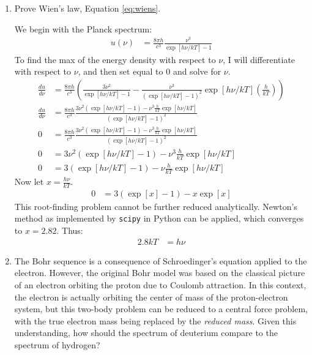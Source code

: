\begin{enumerate}
\item Prove Wien's law, Equation \ref{eq:wiens}.

\begin{answer}
We begin with the Planck spectrum:
    \begin{align*}
        u(\nu) & = \frac{8 \pi h}{c^3} \frac{\nu^3}{\exp[h \nu / k T] - 1}
    \end{align*}
    To find the max of the energy density with respect to $\nu$, I will differentiate with respect to $\nu$, and then set equal to 0 and solve for $\nu$.
    \begin{align*}
        \frac{d u}{d \nu} & = \frac{8 \pi h}{c^3}
    \left( \frac{3 \nu^2}{\exp[h \nu / k T] - 1} - \frac{\nu^3}{(\exp[h \nu
    / k T] - 1)^2}\exp[h \nu/k T]\left(\frac{h}{k T}\right) \right) \\
        \frac{d u}{d \nu} & = \frac{8 \pi h}{c^3} \frac{3 \nu^2 (\exp[h \nu / k T] - 1) - \nu^3 \frac{h}{k T} \exp[h \nu/k T]}{(\exp[h \nu / k T] - 1)^2} \\
        0 & = \frac{8 \pi h}{c^3} \frac{3 \nu^2 (\exp[h \nu / k T] - 1) - \nu^3 \frac{h}{k T} \exp[h \nu/k T]}{(\exp[h \nu / k T] - 1)^2} \\
        0 & =  3 \nu^2 (\exp[h \nu / k T] - 1) - \nu^3 \frac{h}{k T} \exp[h \nu/k T] \\
        0 & =  3 (\exp[h \nu / k T] - 1) - \nu \frac{h}{k T} \exp[h \nu/k T]
    \end{align*}
    Now let $x = \frac{h \nu}{k T}$.
    \begin{align*}
        0 & =  3 (\exp[x] - 1) - x \exp[x]
    \end{align*}
    This root-finding problem cannot be further reduced
    analytically. Newton's method as
    implemented by {\tt scipy} in Python can be applied, which
    converges to $x=2.82$. Thus:
    \begin{align*}
        2.8 k T & = h \nu
    \end{align*}
\end{answer}

\item The Bohr sequence is a consequence of Schroedinger's equation
  applied to the electron. However, the original Bohr model was based
  on the classical picture of an electron orbiting the proton due to
  Coulomb attraction. In this context, the electron is actually
  orbiting the center of mass of the proton-electron system, but this
  two-body problem can be reduced to a central force problem, with the
  true electron mass being replaced by the {\it reduced mass}. Given
  this understanding, how should the spectrum of deuterium compare to
  the spectrum of hydrogen?


\end{enumerate}
